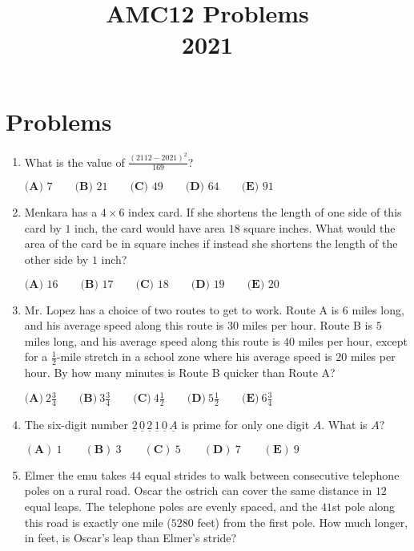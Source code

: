 \documentclass{article}
\title{AMC12 Problems \\ 2021}
\date{}
\begin{document}
\maketitle\thispagestyle{fancy}\newpage\section*{Problems}\begin{enumerate}[label=\arabic*., itemsep=0.5em]\item What is the value of $\frac{(2112-2021)^2}{169}$?

$\textbf{(A) } 7 \qquad\textbf{(B) } 21 \qquad\textbf{(C) } 49 \qquad\textbf{(D) } 64 \qquad\textbf{(E) } 91$\par \vspace{0.5em}\item Menkara has a $4 \times 6$ index card. If she shortens the length of one side of this card by $1$ inch, the card would have area $18$ square inches. What would the area of the card be in square inches if instead she shortens the length of the other side by $1$ inch?

$\textbf{(A) }16\qquad\textbf{(B) }17\qquad\textbf{(C) }18\qquad\textbf{(D) }19\qquad\textbf{(E) }20$\par \vspace{0.5em}\item Mr. Lopez has a choice of two routes to get to work. Route A is $6$ miles long, and his average speed along this route is $30$ miles per hour. Route B is $5$ miles long, and his average speed along this route is $40$ miles per hour, except for a $\frac{1}{2}$-mile stretch in a school zone where his average speed is $20$ miles per hour. By how many minutes is Route B quicker than Route A?

$\textbf{(A)}\ 2 \frac{3}{4}  \qquad\textbf{(B)}\  3 \frac{3}{4} \qquad\textbf{(C)}\  4 \frac{1}{2} \qquad\textbf{(D)}\
 5 \frac{1}{2} \qquad\textbf{(E)}\ 6 \frac{3}{4}$\par \vspace{0.5em}\item The six-digit number $\underline{2}\,\underline{0}\,\underline{2}\,\underline{1}\,\underline{0}\,\underline{A}$ is prime for only one digit $A.$ What is $A?$

$(\textbf{A})\: 1\qquad(\textbf{B}) \: 3\qquad(\textbf{C}) \: 5 \qquad(\textbf{D}) \: 7\qquad(\textbf{E}) \: 9$\par \vspace{0.5em}\item Elmer the emu takes $44$ equal strides to walk between consecutive telephone poles on a rural road. Oscar the ostrich can cover the same distance in $12$ equal leaps. The telephone poles are evenly spaced, and the $41$st pole along this road is exactly one mile ($5280$ feet) from the first pole. How much longer, in feet, is Oscar's leap than Elmer's stride?


\end{enumerate}
\end{document}
